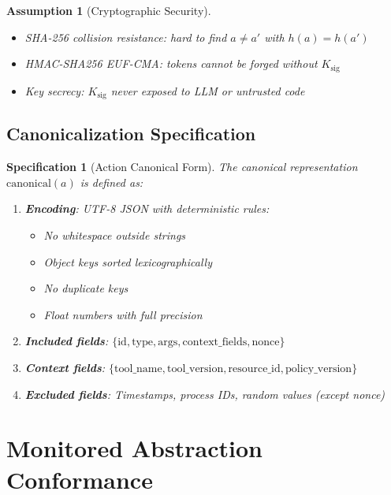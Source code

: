 \documentclass[12pt]{article}
\newtheorem{spec}{Specification}[section]
\newtheorem{assumption}{Assumption}[section]
\begin{document}
\begin{assumption}[Cryptographic Security]
\begin{itemize}
    \item SHA-256 collision resistance: hard to find $a \neq a'$ with $h(a) = h(a')$
    \item HMAC-SHA256 EUF-CMA: tokens cannot be forged without $K_{\text{sig}}$
    \item Key secrecy: $K_{\text{sig}}$ never exposed to LLM or untrusted code
\end{itemize}
\end{assumption}

\subsection{Canonicalization Specification}

\begin{spec}[Action Canonical Form]
The canonical representation $\mathrm{canonical}(a)$ is defined as:
\begin{enumerate}
    \item \textbf{Encoding}: UTF-8 JSON with deterministic rules:
    \begin{itemize}
        \item No whitespace outside strings
        \item Object keys sorted lexicographically
        \item No duplicate keys
        \item Float numbers with full precision
    \end{itemize}
    \item \textbf{Included fields}: $\{\text{id}, \text{type}, \text{args}, \text{context\_fields}, \text{nonce}\}$
    \item \textbf{Context fields}: $\{\text{tool\_name}, \text{tool\_version}, \text{resource\_id}, \text{policy\_version}\}$
    \item \textbf{Excluded fields}: Timestamps, process IDs, random values (except nonce)
\end{enumerate}
\end{spec}

\section{Monitored Abstraction Conformance}
\end{document}
